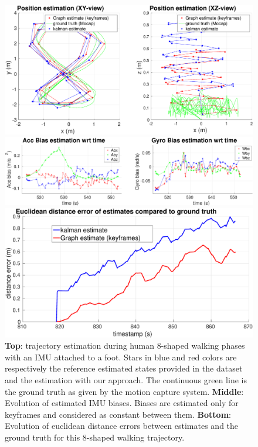 \begin{figure}[tb]
\centering
\includegraphics[scale=0.175]{figures/experiments/8shape/XY_XZ_viewsRotated2.eps}
\par\vspace{4mm}
\includegraphics[scale=0.175]{figures/experiments/8shape/bias.eps}
\par\vspace{4mm}
\includegraphics[scale=0.170]{figures/experiments/8shape/euclidean_err.eps}
\caption{ 
{\bf Top}: trajectory estimation during human 8-shaped walking phases with an IMU attached to a foot. Stars in blue and red colors are respectively the reference estimated states provided in the dataset and the estimation with our approach.
The continuous green line is the ground truth as given by the motion capture system.
{\bf Middle}: Evolution of estimated IMU biases. Biases are estimated only for keyframes and considered as constant between them.
{\bf Bottom}: Evolution of euclidean distance errors between estimates and the ground truth for this 8-shaped walking trajectory.
}
\label{fig:8shape_walk}
\end{figure}

